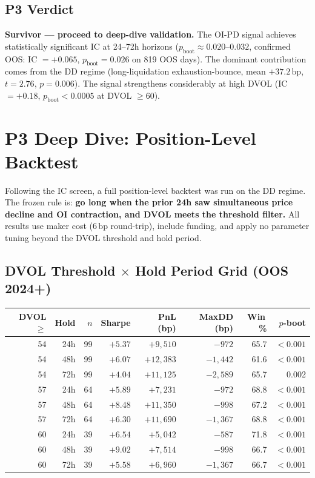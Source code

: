 \documentclass[12pt, a4paper]{article}
\theoremstyle{plain}
\theoremstyle{definition}
\newcommand{\bp}{\,\mathrm{bp}}
\begin{document}
\subsection{P3 Verdict}

\textbf{Survivor --- proceed to deep-dive validation.}  The OI-PD signal
achieves statistically significant IC at 24--72h horizons ($p_{\mathrm{boot}}
\approx 0.020$--$0.032$, confirmed OOS: IC $= +0.065$, $p_{\mathrm{boot}}
= 0.026$ on 819 OOS days).  The dominant contribution comes from the DD
regime (long-liquidation exhaustion-bounce, mean $+37.2\bp$, $t = 2.76$,
$p = 0.006$).  The signal strengthens considerably at high DVOL
(IC $= +0.18$, $p_{\mathrm{boot}} < 0.0005$ at DVOL $\geq 60$).

\section{P3 Deep Dive: Position-Level Backtest}
\label{sec:p3deepdive}

Following the IC screen, a full position-level backtest was run on the
DD regime.  The frozen rule is: \textbf{go long when the prior 24h saw
simultaneous price decline and OI contraction, and DVOL meets the
threshold filter.}  All results use maker cost ($6\bp$ round-trip),
include funding, and apply no parameter tuning beyond the DVOL threshold
and hold period.

\subsection{DVOL Threshold $\times$ Hold Period Grid (OOS 2024+)}

\begin{center}
\begin{tabular}{rrrrrrrr}
\toprule
DVOL $\geq$ & Hold & $n$ & Sharpe & PnL (bp) & MaxDD (bp) & Win\,\% & $p$-boot \\
\midrule
54 & 24h &  99 & $+5.37$ & $+9{,}510$  & $-972$   & 65.7 & $<0.001$ \\
54 & 48h &  99 & $+6.07$ & $+12{,}383$ & $-1{,}442$ & 61.6 & $<0.001$ \\
54 & 72h &  99 & $+4.04$ & $+11{,}125$ & $-2{,}589$ & 65.7 & 0.002   \\
\midrule
57 & 24h &  64 & $+5.89$ & $+7{,}231$  & $-972$   & 68.8 & $<0.001$ \\
57 & 48h &  64 & $+8.48$ & $+11{,}350$ & $-998$   & 67.2 & $<0.001$ \\
57 & 72h &  64 & $+6.30$ & $+11{,}690$ & $-1{,}367$ & 68.8 & $<0.001$ \\
\midrule
60 & 24h &  39 & $+6.54$ & $+5{,}042$  & $-587$   & 71.8 & $<0.001$ \\
60 & 48h &  39 & $+9.02$ & $+7{,}514$  & $-998$   & 66.7 & $<0.001$ \\
60 & 72h &  39 & $+5.58$ & $+6{,}960$  & $-1{,}367$ & 66.7 & $<0.001$ \\
\bottomrule
\end{tabular}
\end{center}
\end{document}

